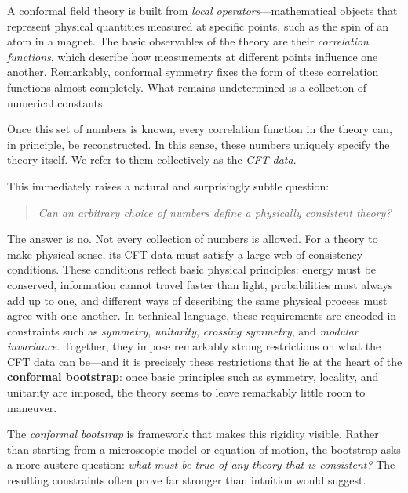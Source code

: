 \documentclass[11pt, oneside]{article}
\begin{document}
{\color{black}


A conformal field theory is built from \emph{local operators}—mathematical objects that represent
physical quantities measured at specific points, such as the spin of an atom in a magnet. The basic
observables of the theory are their \emph{correlation functions}, which describe how measurements at
different points influence one another. Remarkably, conformal symmetry fixes the form of these
correlation functions almost completely. What remains undetermined is a collection of numerical
constants.



Once this set of numbers is known, every correlation function in the theory can, in principle, be
reconstructed. In this sense, these numbers uniquely specify the theory itself. We refer to them
collectively as the \emph{CFT data}. 



This immediately raises a natural and surprisingly subtle question:

\begin{quote}
\emph{Can an arbitrary choice of numbers define a physically consistent theory?}
\end{quote}



The answer is no. Not every collection of numbers is allowed. For a theory to make physical sense, its
CFT data must satisfy a large web of consistency conditions. These conditions reflect basic physical
principles: energy must be conserved, information cannot travel faster than light, probabilities must
always add up to one, and different ways of describing the same physical process must agree with one
another. In technical language, these requirements are encoded in constraints such as \emph{symmetry},
\emph{unitarity}, \emph{crossing symmetry}, and \emph{modular invariance}.  Together, they impose
remarkably strong restrictions on what the CFT data can be—and it is precisely these restrictions
that lie at the heart of the \textbf{conformal bootstrap}:  once basic principles such
as symmetry, locality, and unitarity are imposed, the theory seems to leave remarkably little room to maneuver.  



The  \emph{conformal bootstrap} is framework that makes this rigidity visible. Rather than starting from a microscopic model or equation of motion, the bootstrap asks a more austere question: \emph{what must be
true of any theory that is consistent?} The resulting constraints often prove far stronger than
intuition would suggest.
}
\end{document}

